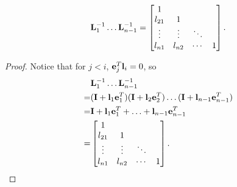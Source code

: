 \begin{lem}
    \label{lem::GaussIverseMulti}
    $$
    {\mathbf{L}}_1^{-1}\ldots{\mathbf{L}}_{n-1}^{-1}=
    \begin{bmatrix}
        1\\
        l_{21}&1\\
        \vdots&\vdots&\ddots\\
        l_{n1}&l_{n2}&\cdots&1
    \end{bmatrix}.
    $$ 
\end{lem}
\begin{proof}
    Notice that for $j<i$, ${\mathbf{e}}_j^T{\mathbf{l}}_i=0$, so 
    \begin{align*}
        &{\mathbf{L}}_1^{-1}\ldots{\mathbf{L}}_{n-1}^{-1}\\
        =&({\mathbf{I}}+{\mathbf{l}}_1{\mathbf{e}}_1^T)({\mathbf{I}}+{\mathbf{l}}_2{\mathbf{e}}_2^T)\ldots({\mathbf{I}}
        +{\mathbf{l}}_{n-1}{\mathbf{e}}_{n-1}^T)\\
        =&{\mathbf{I}}+{\mathbf{l}}_1{\mathbf{e}}_1^T+\ldots+{\mathbf{l}}_{n-1}{\mathbf{e}}_{n-1}^T\\
        =&\begin{bmatrix}
            1\\
            l_{21}&1\\
            \vdots&\vdots&\ddots\\
            l_{n1}&l_{n2}&\cdots&1
        \end{bmatrix}.
    \end{align*}
\end{proof}

